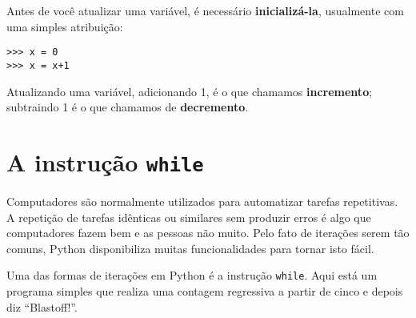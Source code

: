 Antes de você atualizar uma variável, é necessário {\bf inicializá-la},
usualmente com uma simples atribuição:


\beforeverb
\begin{verbatim}
>>> x = 0
>>> x = x+1
\end{verbatim}
\afterverb
%

%
Atualizando uma variável, adicionando 1, é o que chamamos {\bf incremento};
subtraindo 1 é o que chamamos de {\bf decremento}.


\section{A instrução {\tt while}}




Computadores são normalmente utilizados para automatizar tarefas repetitivas.
A repetição de tarefas idênticas ou similares sem produzir erros é algo que
computadores fazem bem e as pessoas não muito. Pelo fato de iterações serem tão
comuns, Python disponibiliza muitas funcionalidades para tornar isto fácil.


Uma das formas de iterações em Python é a instrução {\tt while}. Aqui está
um programa simples que realiza uma contagem regressiva a partir de cinco e
depois diz ``Blastoff!''.

